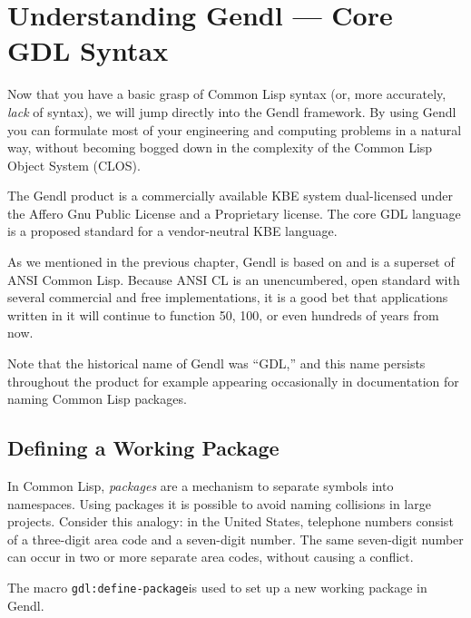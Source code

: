 \documentclass [11pt]{book}
\begin{document}
\chapter{Understanding Gendl --- Core GDL Syntax}

\label{chap:understandinggendl---coregdlsyntax}



Now that you have a basic grasp of Common Lisp syntax (or, more accurately, \emph{lack} of syntax), we will jump directly into the Gendl framework. By using Gendl you can formulate most of 
your engineering and computing problems in a natural way, without becoming bogged down in the complexity of
the Common Lisp Object System (CLOS).



The Gendl product is a commercially available KBE system
dual-licensed under the Affero Gnu Public License and a Proprietary
license. The core GDL language is a proposed standard for a
vendor-neutral KBE language.



As we mentioned in the previous chapter, Gendl is based on
and is a superset of ANSI Common Lisp. Because ANSI CL is an
unencumbered, open standard with several commercial and free
implementations, it is a good bet that applications written in it will
continue to function 50, 100, or even hundreds of years from now.



Note that the historical name of Gendl was ``GDL,'' and this name persists throughout the product
for example appearing occasionally in documentation for naming Common Lisp packages.



\section{Defining a Working Package}

\label{sec:definingaworkingpackage}



In Common Lisp, \emph{packages} are a mechanism to separate symbols into
namespaces. Using packages it is possible to avoid naming collisions
in large projects. Consider this analogy: in the United States,
telephone numbers consist of a three-digit area code and a seven-digit
number. The same seven-digit number can occur in two or more separate
area codes, without causing a conflict.



The macro \texttt{gdl:define-package}is used to set up a new working package in Gendl.
\end{document}
